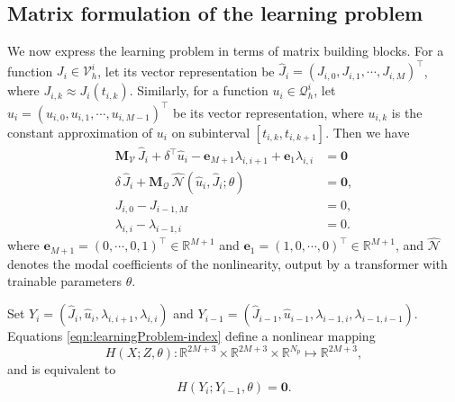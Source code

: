 \documentclass[12pt]{article}
\begin{document}
\subsection{Matrix formulation of the learning problem}
We now express the learning problem in terms of matrix building blocks.  For a function $J_i \in \mathcal{V}_h^i$, let its vector representation be $\hat{J}_i  = (J_{i,0}, J_{i,1}, \cdots, J_{i,M})^\intercal$, where $J_{i,k} \approx J_i(t_{i,k})$.  Similarly, for a function $u_i \in \mathcal{Q}_h^i$, let $\hat{u}_i = (u_{i,0}, u_{i,1}, \cdots, u_{i,M-1})^\intercal$ be its vector representation, where $u_{i,k}$ is the constant approximation of $u_i$ on subinterval $[t_{i,k}, t_{i, k+1}]$. Then we have
\begin{equation}\label{eqn:learningProblem-index}
	\begin{aligned}
		\mathbf{M}_\mathcal{V}\, \hat{J}_i + \delta^\intercal \hat{u}_i - \mathbf{e}_{M+1} \lambda_{i,i+1} +  \mathbf{e}_1 \lambda_{i,i}
		&=  \mathbf{0} \\
		\delta\, \hat{J}_i + \mathbf{M}_\mathcal{Q} \, \widehat{\mathcal{N}}(\hat{u}_i,\hat{J}_i;\theta)
		&= \mathbf{0},\\
		J_{i,0} - J_{i-1,M}&=0,
		\\
		\lambda_{i,i}  - \lambda_{i-1,i}&= 0.
	\end{aligned}
\end{equation}
where $\mathbf{e}_{M+1} = (0, \cdots, 0, 1)^\intercal \in \mathbb{R}^{M+1}$ and $\mathbf{e}_1 = (1, 0, \cdots, 0)^{\intercal} \in \mathbb{R}^{M+1}$, and $\widehat{\mathcal{N}}$ denotes the modal coefficients of the nonlinearity, output by a transformer with trainable parameters $\theta$.  

Set $Y_i = (\hat{J}_i, \hat{u}_i, \lambda_{i,i+1}, \lambda_{i,i})$ and $Y_{i-1} = (\hat{J}_{i-1}, \hat{u}_{i-1}, \lambda_{i-1,i}, \lambda_{i-1,i-1})$. Equations \eqref{eqn:learningProblem-index} define a nonlinear mapping 
$$
H(X; Z, \theta): \mathbb{R}^{2M+3} \times \mathbb{R}^{2M+3} \times \mathbb{R}^{N_p} \mapsto \mathbb{R}^{2M+3},
$$ 
and is equivalent to 
\begin{align}\label{eqn:H-Y-eqn}
	H(Y_{i}; Y_{i-1}, \theta) = \mathbf{0}.
\end{align}
\end{document}
